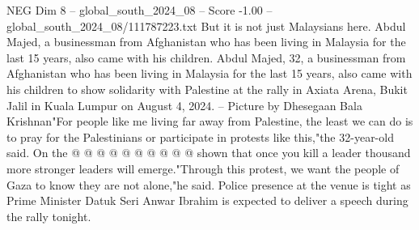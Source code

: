 \begin{textsample}{NEG Dim 8 – global\_south\_2024\_08 – Score -1.00 – global\_south\_2024\_08/111787223.txt}
But it is not just Malaysians here.
Abdul Majed, a businessman from Afghanistan who has been living in Malaysia for the last 15 years, also came with his children.
Abdul Majed, 32, a businessman from Afghanistan who has been living in Malaysia for the last 15 years, also came with his children to show solidarity with Palestine at the rally in Axiata Arena, Bukit Jalil in Kuala Lumpur on August 4, 2024. -- Picture by Dhesegaan Bala Krishnan"For people like me living far away from Palestine, the least we can do is to pray for the Palestinians or participate in protests like this,"the 32-year-old said.
On the @ @ @ @ @ @ @ @ @ @ shown that once you kill a leader thousand more stronger leaders will emerge."Through this protest, we want the people of Gaza to know they are not alone,"he said.
Police presence at the venue is tight as Prime Minister Datuk Seri Anwar Ibrahim is expected to deliver a speech during the rally tonight.

\end{textsample}

